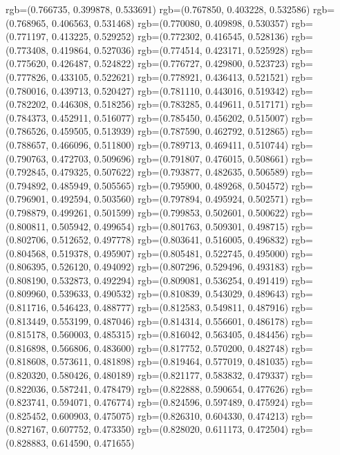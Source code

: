 {{{					rgb=(0.766735, 0.399878, 0.533691)
					rgb=(0.767850, 0.403228, 0.532586)
					rgb=(0.768965, 0.406563, 0.531468)
					rgb=(0.770080, 0.409898, 0.530357)
					rgb=(0.771197, 0.413225, 0.529252)
					rgb=(0.772302, 0.416545, 0.528136)
					rgb=(0.773408, 0.419864, 0.527036)
					rgb=(0.774514, 0.423171, 0.525928)
					rgb=(0.775620, 0.426487, 0.524822)
					rgb=(0.776727, 0.429800, 0.523723)
					rgb=(0.777826, 0.433105, 0.522621)
					rgb=(0.778921, 0.436413, 0.521521)
					rgb=(0.780016, 0.439713, 0.520427)
					rgb=(0.781110, 0.443016, 0.519342)
					rgb=(0.782202, 0.446308, 0.518256)
					rgb=(0.783285, 0.449611, 0.517171)
					rgb=(0.784373, 0.452911, 0.516077)
					rgb=(0.785450, 0.456202, 0.515007)
					rgb=(0.786526, 0.459505, 0.513939)
					rgb=(0.787590, 0.462792, 0.512865)
					rgb=(0.788657, 0.466096, 0.511800)
					rgb=(0.789713, 0.469411, 0.510744)
					rgb=(0.790763, 0.472703, 0.509696)
					rgb=(0.791807, 0.476015, 0.508661)
					rgb=(0.792845, 0.479325, 0.507622)
					rgb=(0.793877, 0.482635, 0.506589)
					rgb=(0.794892, 0.485949, 0.505565)
					rgb=(0.795900, 0.489268, 0.504572)
					rgb=(0.796901, 0.492594, 0.503560)
					rgb=(0.797894, 0.495924, 0.502571)
					rgb=(0.798879, 0.499261, 0.501599)
					rgb=(0.799853, 0.502601, 0.500622)
					rgb=(0.800811, 0.505942, 0.499654)
					rgb=(0.801763, 0.509301, 0.498715)
					rgb=(0.802706, 0.512652, 0.497778)
					rgb=(0.803641, 0.516005, 0.496832)
					rgb=(0.804568, 0.519378, 0.495907)
					rgb=(0.805481, 0.522745, 0.495000)
					rgb=(0.806395, 0.526120, 0.494092)
					rgb=(0.807296, 0.529496, 0.493183)
					rgb=(0.808190, 0.532873, 0.492294)
					rgb=(0.809081, 0.536254, 0.491419)
					rgb=(0.809960, 0.539633, 0.490532)
					rgb=(0.810839, 0.543029, 0.489643)
					rgb=(0.811716, 0.546423, 0.488777)
					rgb=(0.812583, 0.549811, 0.487916)
					rgb=(0.813449, 0.553199, 0.487046)
					rgb=(0.814314, 0.556601, 0.486178)
					rgb=(0.815178, 0.560003, 0.485315)
					rgb=(0.816042, 0.563405, 0.484456)
					rgb=(0.816898, 0.566806, 0.483600)
					rgb=(0.817752, 0.570200, 0.482748)
					rgb=(0.818608, 0.573611, 0.481898)
					rgb=(0.819464, 0.577019, 0.481035)
					rgb=(0.820320, 0.580426, 0.480189)
					rgb=(0.821177, 0.583832, 0.479337)
					rgb=(0.822036, 0.587241, 0.478479)
					rgb=(0.822888, 0.590654, 0.477626)
					rgb=(0.823741, 0.594071, 0.476774)
					rgb=(0.824596, 0.597489, 0.475924)
					rgb=(0.825452, 0.600903, 0.475075)
					rgb=(0.826310, 0.604330, 0.474213)
					rgb=(0.827167, 0.607752, 0.473350)
					rgb=(0.828020, 0.611173, 0.472504)
					rgb=(0.828883, 0.614590, 0.471655)
}}}
